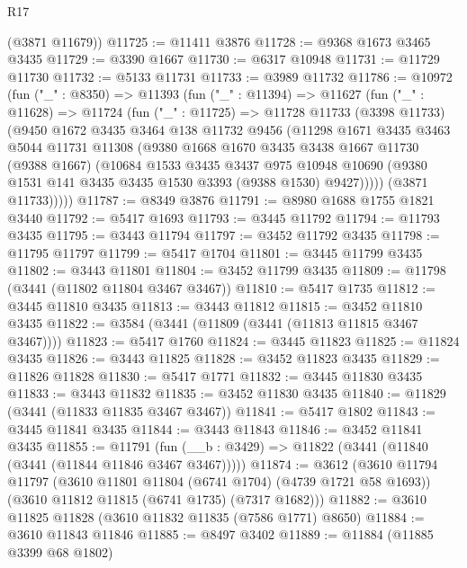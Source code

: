\begin{lexlean}{R17}
\begin{coremodule}
      (@3871 @11679))
@11725 := @11411 @3876
@11728 := @9368 @1673 @3465 @3435
@11729 := @3390 @1667
@11730 := @6317 @10948
@11731 := @11729 @11730
@11732 := @5133 @11731
@11733 := @3989 @11732
@11786 := @10972
    (fun ("_" : @8350) =>
    @11393
      (fun ("_" : @11394) =>
      @11627
        (fun ("_" : @11628) =>
        @11724
          (fun ("_" : @11725) =>
          @11728
            @11733
            (@3398 @11733)
            (@9450
              @1672
              @3435
              @3464
              @138
              @11732
              @9456
              (@11298
                @1671
                @3435
                @3463
                @5044
                @11731
                @11308
                (@9380
                  @1668
                  @1670
                  @3435
                  @3438
                  @1667
                  @11730
                  (@9388 @1667)
                  (@10684
                    @1533
                    @3435
                    @3437
                    @975
                    @10948
                    @10690
                    (@9380 @1531 @141 @3435 @3435 @1530 @3393 (@9388 @1530) @9427)))))
            (@3871 @11733)))))
@11787 := @8349 @3876
@11791 := @8980 @1688 @1755 @1821 @3440
@11792 := @5417 @1693
@11793 := @3445 @11792
@11794 := @11793 @3435
@11795 := @3443 @11794
@11797 := @3452 @11792 @3435
@11798 := @11795 @11797
@11799 := @5417 @1704
@11801 := @3445 @11799 @3435
@11802 := @3443 @11801
@11804 := @3452 @11799 @3435
@11809 := @11798 (@3441 (@11802 @11804 @3467 @3467))
@11810 := @5417 @1735
@11812 := @3445 @11810 @3435
@11813 := @3443 @11812
@11815 := @3452 @11810 @3435
@11822 := @3584 (@3441 (@11809 (@3441 (@11813 @11815 @3467 @3467))))
@11823 := @5417 @1760
@11824 := @3445 @11823
@11825 := @11824 @3435
@11826 := @3443 @11825
@11828 := @3452 @11823 @3435
@11829 := @11826 @11828
@11830 := @5417 @1771
@11832 := @3445 @11830 @3435
@11833 := @3443 @11832
@11835 := @3452 @11830 @3435
@11840 := @11829 (@3441 (@11833 @11835 @3467 @3467))
@11841 := @5417 @1802
@11843 := @3445 @11841 @3435
@11844 := @3443 @11843
@11846 := @3452 @11841 @3435
@11855 := @11791 (fun (__b : @3429) => @11822 (@3441 (@11840 (@3441 (@11844 @11846 @3467 @3467)))))
@11874 := @3612
    (@3610
      @11794
      @11797
      (@3610 @11801 @11804 (@6741 @1704) (@4739 @1721 @58 @1693))
      (@3610 @11812 @11815 (@6741 @1735) (@7317 @1682)))
@11882 := @3610 @11825 @11828 (@3610 @11832 @11835 (@7586 @1771) @8650)
@11884 := @3610 @11843 @11846
@11885 := @8497 @3402
@11889 := @11884 (@11885 @3399 @68 @1802)

\end{coremodule}
\end{lexlean}

